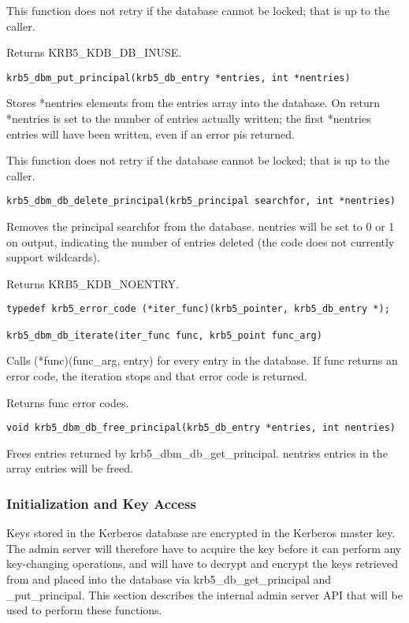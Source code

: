This function does not retry if the database cannot be locked; that is
up to the caller.  

Returns KRB5_KDB_DB_INUSE.

\begin{verbatim}
krb5_dbm_put_principal(krb5_db_entry *entries, int *nentries)
\end{verbatim}

Stores *nentries elements from the entries array into the database.
On return *nentries is set to the number of entries actually written;
the first *nentries entries will have been written, even if an error
pis returned.

This function does not retry if the database cannot be locked; that is
up to the caller.

\begin{verbatim}
krb5_dbm_db_delete_principal(krb5_principal searchfor, int *nentries)
\end{verbatim}

Removes the principal searchfor from the database.  nentries will be
set to 0 or 1 on output, indicating the number of entries deleted (the
code does not currently support wildcards).

Returns KRB5_KDB_NOENTRY.

\begin{verbatim}
typedef krb5_error_code (*iter_func)(krb5_pointer, krb5_db_entry *);

krb5_dbm_db_iterate(iter_func func, krb5_point func_arg)
\end{verbatim}

Calls (*func)(func_arg, entry) for every entry in the database.  If
func returns an error code, the iteration stops and that error code is
returned.

Returns func error codes.

\begin{verbatim}
void krb5_dbm_db_free_principal(krb5_db_entry *entries, int nentries)
\end{verbatim}

Frees entries returned by krb5_dbm_db_get_principal.  nentries entries
in the array entries will be freed.

\subsubsection{Initialization and Key Access}

Keys stored in the Kerberos database are encrypted in the Kerberos
master key.  The admin server will therefore have to acquire the key
before it can perform any key-changing operations, and will have to
decrypt and encrypt the keys retrieved from and placed into the
database via krb5_db_get_principal and _put_principal.  This section
describes the internal admin server API that will be used to perform
these functions.

